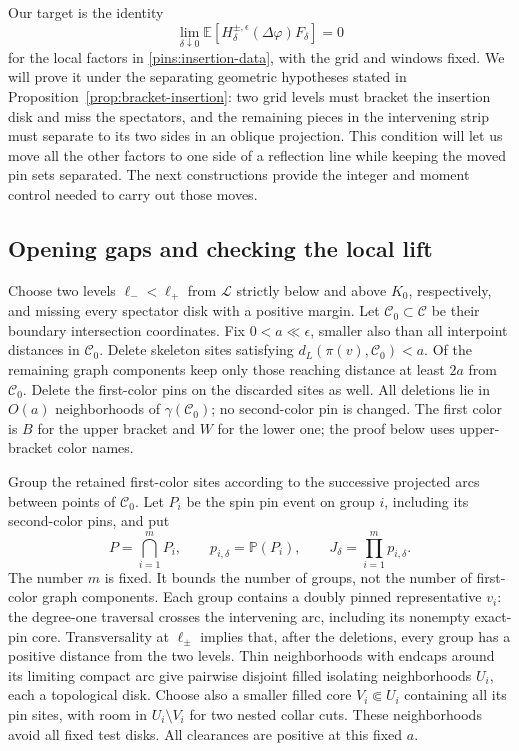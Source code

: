 \documentclass[11pt]{article}
\theoremstyle{definition}
\theoremstyle{remark}
\numberwithin{equation}{section}
\begin{document}
Our target is the identity
\begin{equation}\label{eq:bracket-insertion}
 \lim_{\delta\downarrow0}
 \mathbb E\left[H_\delta^{\pm,\epsilon}(\Delta\varphi)
                       F_\delta\right]=0
\end{equation}
for the local factors in \eqref{pins:insertion-data}, with the grid and
windows fixed.  We will prove it under the separating geometric
hypotheses stated in Proposition~\ref{prop:bracket-insertion}: two grid
levels must bracket the insertion disk and miss the spectators, and the
remaining pieces in the intervening strip must separate to its two
sides in an oblique projection.  This condition will let us move all the
other factors to one side of a reflection line while keeping the moved
pin sets separated.  The next constructions provide the
integer and moment control needed to carry out those moves.

\subsection{Opening gaps and checking the local lift}

Choose two levels $\ell_-<\ell_+$ from $\mathcal L$ strictly below and
above $K_0$, respectively, and missing every spectator disk with a
positive margin.  Let $\mathcal C_0\subset\mathcal C$ be their boundary
intersection coordinates.  Fix $0<a\ll\epsilon$, smaller also than all
interpoint distances in $\mathcal C_0$.  Delete skeleton sites satisfying
$d_L(\pi(v),\mathcal C_0)<a$.  Of the remaining graph components keep
only those reaching distance at least $2a$ from $\mathcal C_0$.  Delete
the first-color pins on the discarded sites as well.  All deletions
lie in $O(a)$ neighborhoods of $\gamma(\mathcal C_0)$; no second-color
pin is changed.  The first color is $B$ for the upper bracket and $W$
for the lower one; the proof below uses upper-bracket color names.

Group the retained first-color sites according to the successive
projected arcs between points of $\mathcal C_0$.  Let $P_i$ be the spin
pin event on group $i$, including its second-color pins, and put
\begin{equation}\label{pins:rare-normalization}
 P=\bigcap_{i=1}^m P_i,\qquad p_{i,\delta}=\mathbb P(P_i),\qquad
 J_\delta=\prod_{i=1}^m p_{i,\delta}.
\end{equation}
The number $m$ is fixed.  It bounds the number of groups, not the number
of first-color graph components.  Each group contains a doubly pinned
representative $v_i$: the degree-one traversal crosses the intervening
arc, including its nonempty exact-pin core.  Transversality at
$\ell_\pm$ implies that, after the deletions, every group has a
positive distance from the two levels.  Thin neighborhoods with endcaps
around its limiting compact arc give pairwise disjoint filled isolating
neighborhoods $U_i$, each a topological disk.  Choose also a smaller
filled core $V_i\Subset U_i$ containing all its pin sites, with room
in $U_i\setminus V_i$ for two nested collar cuts.  These neighborhoods
avoid all fixed test disks.  All clearances are positive at this fixed
$a$.
\end{document}
